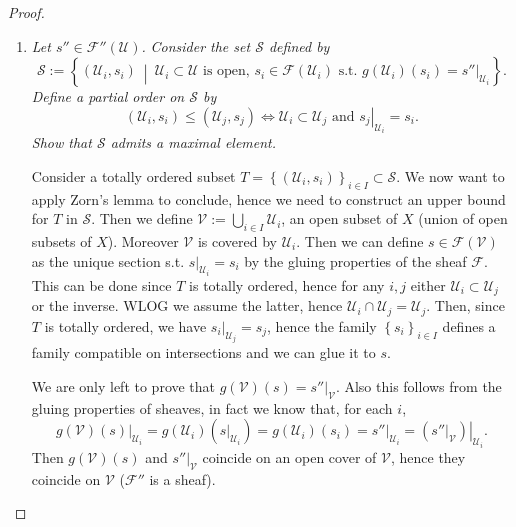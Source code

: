 \documentclass[../Main]{subfiles}
\begin{document}
\begin{proof}
	\begin{enumerate}
	\item {\em Let $s'' \in \mathcal{F}''(\mathcal{U})$.}
		{\em Consider the set $\mathcal{S}$ defined by}
		\begin{equation}
		\mathcal{S} := \left\{ \left(  \mathcal{U}_i, s_i\right) \ \middle|\
		\mathcal{U}_i \subset \mathcal{U} \text{ is open, }
		s_i \in \mathcal{F}(\mathcal{U}_i) \text{ s.t. }
		g(\mathcal{U}_i)(s_i) = \left.s''\right|_{\mathcal{U}_i} \right\}
		.\end{equation}
		{\em Define a partial order on $\mathcal{S}$ by}
		\begin{equation}
		\left(\mathcal{U}_i, s_i\right) \leq \left( \mathcal{U}_j, s_j\right) \iff
		\mathcal{U}_i \subset \mathcal{U}_j
		\text{ and }
		\left.s_j\right|_{\mathcal{U}_i} = s_i
		.\end{equation}
		{\em Show that $\mathcal{S}$ admits a maximal element.}

		Consider a totally ordered subset
		$T = \left\{ \left(\mathcal{U}_i, s_i\right) \right\}_{i \in I} \subset \mathcal{S}$.
		We now want to apply Zorn's lemma to conclude, hence we need to construct an
		upper bound for $T$ in $\mathcal{S}$.
		Then we define $\mathcal{V} := \bigcup_{i \in I} \mathcal{U}_i$, an open subset of
		$X$ (union of open subsets of $X$).
		Moreover $\mathcal{V}$ is covered by $\mathcal{U}_i$. Then we can define
		$s \in \mathcal{F}(\mathcal{V})$ as the unique section s.t.
		$\left.s\right|_{\mathcal{U}_i} = s_i$ by the gluing properties of the sheaf $\mathcal{F}$.
		This can be done since $T$ is totally ordered, hence for any $i,j$ either
		$\mathcal{U}_i \subset \mathcal{U}_j$ or the inverse. WLOG we assume the latter,
		hence $\mathcal{U}_i \cap \mathcal{U}_j = \mathcal{U}_j$.
		Then, since $T$ is totally ordered, we have $\left.s_i\right|_{\mathcal{U}_j} = s_j$,
		hence the family $\left\{ s_i \right\}_{i \in I}$ defines a family compatible
		on intersections and we can glue it to $s$.

		We are only left to prove that $g(\mathcal{V})(s) = \left.s''\right|_{\mathcal{V}}$.
		Also this follows from the gluing properties of sheaves, in fact we know that,
		for each $i$,
		\begin{equation}
			\left.g(\mathcal{V})(s)\right|_{\mathcal{U}_i} =
			g(\mathcal{U}_i)(\left.s\right|_{\mathcal{U}_i}) =
			g(\mathcal{U}_i)(s_i) =
			\left.s''\right|_{\mathcal{U}_i} =
			\left.\left(\left.s''\right|_{\mathcal{V}}\right) \right|_{\mathcal{U}_i}
		.\end{equation}
		Then $g(\mathcal{V})(s)$ and $\left.s''\right|_{\mathcal{V}}$
		coincide on an open cover of $\mathcal{V}$, hence they coincide on $\mathcal{V}$
		($\mathcal{F}''$ is a sheaf).


\end{enumerate}
\end{proof}
\end{document}
